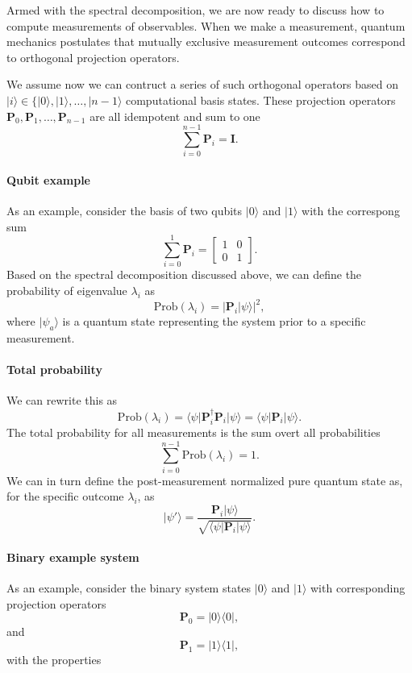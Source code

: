 Armed with the spectral decomposition, we are now ready to discuss how
to compute measurements of observables.  When we make a measurement,
quantum mechanics postulates that mutually exclusive measurement
outcomes correspond to orthogonal projection operators.

We assume now we can contruct a series of such orthogonal operators based on $\vert i \rangle \in \{\vert 0\rangle, \vert 1\rangle,\dots, \vert n-1\rangle$ computational basis states. These projection operators $\bm{P}_0,\bm{P}_1,\dots,\bm{P}_{n-1}$ are all idempotent and sum to one
\[
\sum_{i=0}^{n-1}\bm{P}_i=\bm{I}.
\]


\paragraph{Qubit example}

As an example, consider the basis of two qubits $\vert 0\rangle$ and $\vert 1\rangle$ with the correspong sum
\[
\sum_{i=0}^{1}\bm{P}_i=\begin{bmatrix} 1 & 0 \\ 0 & 1\end{bmatrix}.
\]
Based on the spectral decomposition discussed above, we can define the probability of eigenvalue $\lambda_i$ as
\[
\mathrm{Prob}(\lambda_i) = \vert \bm{P}_i\vert \psi\rangle\vert^2,
\]
where $\vert \psi_a\rangle$ is a quantum state representing the system prior to a specific measurement.


\paragraph{Total probability}

We can rewrite this as 
\[
\mathrm{Prob}(\lambda_i) = \langle \psi\vert \bm{P}_i^{\dagger}\bm{P}_i\vert \psi\rangle =\langle \psi\vert \bm{P}_i\vert \psi\rangle.
\]
The total probability for all measurements is the sum overt all probabilities
\[
\sum_{i=0}^{n-1}\mathrm{Prob}(\lambda_i)=1.
\]
We can in turn define the post-measurement normalized pure quantum state as, for the specific outcome $\lambda_i$, as
\[
\vert \psi'\rangle = \frac{\bm{P}_i\vert \psi\rangle}{\sqrt{\langle \psi \vert \bm{P}_i\vert \psi\rangle}}. 
\]


\paragraph{Binary example system}

As an example, consider the binary system states $\vert 0\rangle$ and $\vert 1\rangle$ with corresponding projection operators
\[
\bm{P}_0 =\vert 0 \rangle \langle 0\vert,
\]
and 
\[
\bm{P}_1 =\vert 1 \rangle \langle 1\vert,
\]
with the properties

